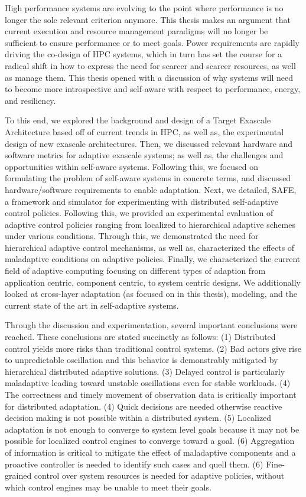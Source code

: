 \label{chap:conclusion}
High performance systems are evolving to the point where performance is no longer the sole relevant criterion anymore. This thesis makes an argument that current execution and resource management paradigms will no longer be sufficient to ensure performance or to meet goals. Power requirements are rapidly driving the co-design of HPC systems, which in turn has set the course for a radical shift in how to express the need for scarcer and scarcer resources, as well as manage them. This thesis opened with a discussion of why systems will need to become more introspective and self-aware with respect to performance, energy, and resiliency.

To this end, we explored the background and design of a Target Exascale Architecture based off of current trends in HPC, as well as, the experimental design of new exascale architectures. Then, we discussed relevant hardware and software metrics for adaptive exascale systems; as well as, the challenges and opportunities within self-aware systems. Following this, we focused on formulating the problem of self-aware systems in concrete terms, and discussed hardware/software requirements to enable adaptation. Next, we detailed, SAFE, a framework and simulator for experimenting with distributed self-adaptive control policies. Following this, we provided an experimental evaluation of adaptive control policies ranging from localized to hierarchical adaptive schemes under various conditions. Through this, we demonstrated the need for hierarchical adaptive control mechanisms, as well as, characterized the effects of maladaptive conditions on adaptive policies. Finally, we characterized the current field of adaptive computing focusing on different types of adaption from application centric, component centric, to system centric designs.  We additionally looked at cross-layer adaptation (as focused on in this thesis), modeling, and the current state of the art in self-adaptive systems. 

Through the discussion and experimentation, several important conclusions were reached. These conclusions are stated succinctly as follows: (1) Distributed control yields more risks than traditional control systems. (2) Bad actors give rise to unpredictable oscillation and this behavior is demonstrably mitigated by hierarchical distributed adaptive solutions. (3) Delayed control is particularly maladaptive leading toward unstable oscillations even for stable workloads. (4) The correctness and timely movement of observation data is critically important for distributed adaptation. (4) Quick decisions are needed otherwise reactive decision making is not possible within a distributed system. (5) Localized adaptation is not enough to converge to system level goals because it may not be possible for localized control engines to converge toward a goal. (6) Aggregation of information is critical to mitigate the effect of maladaptive components and a proactive controller is needed to identify such cases and quell them. (6) Fine-grained control over system resources is needed for adaptive policies, without which control engines may be unable to meet their goals.

